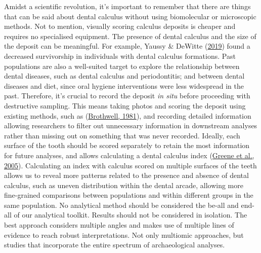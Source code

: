 \documentclass[
  b5paper,
]{book}
\begin{document}
Amidst a scientific revolution, it's important to remember that there
are things that can be said about dental calculus without using
biomolecular or microscopic methods. Not to mention, visually scoring
calculus deposits is cheaper and requires no specialised equipment. The
presence of dental calculus and the size of the deposit can be
meaningful. For example, Yaussy \& DeWitte
(\protect\hyperlink{ref-yaussyCalculusSurvivorship2019}{2019}) found a
decreased survivorship in individuals with dental calculus formations.
Past populations are also a well-suited target to explore the
relationship between dental diseases, such as dental calculus and
periodontitis; and between dental diseases and diet, since oral hygiene
interventions were less widespread in the past. Therefore, it's crucial
to record the deposit \emph{in situ} before proceeding with destructive
sampling. This means taking photos and scoring the deposit using
existing methods, such as
(\protect\hyperlink{ref-brothwellDiggingBones1981}{Brothwell, 1981}),
and recording detailed information allowing researchers to filter out
unnecessary information in downstream analyses rather than missing out
on something that was never recorded. Ideally, each surface of the tooth
should be scored separately to retain the most information for future
analyses, and allows calculating a dental calculus index
(\protect\hyperlink{ref-greeneQuantifyingCalculus2005}{Greene et al.,
2005}). Calculating an index with calculus scored on multiple surfaces
of the teeth allows us to reveal more patterns related to the presence
and absence of dental calculus, such as uneven distribution within the
dental arcade, allowing more fine-grained comparisons between
populations and within different groups in the same population. No
analytical method should be considered the be-all and end-all of our
analytical toolkit. Results should not be considered in isolation. The
best approach considers multiple angles and makes use of multiple lines
of evidence to reach robust interpretations. Not only multiomic
approaches, but studies that incorporate the entire spectrum of
archaeological analyses.
\end{document}
